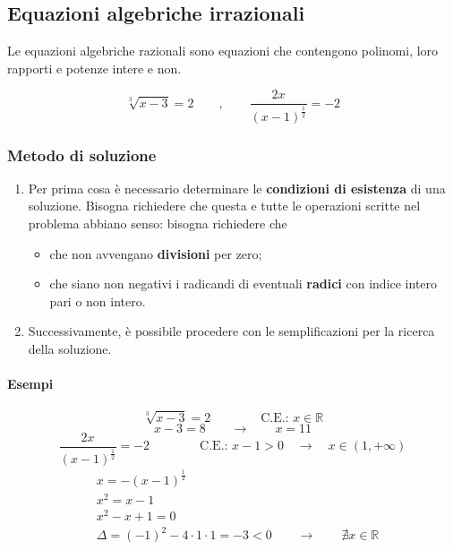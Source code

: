 \subsection{Equazioni algebriche irrazionali}
\begin{definition} Le equazioni algebriche razionali sono equazioni che contengono polinomi, loro rapporti e potenze intere e non.
\end{definition}
\begin{example}
\begin{equation}
    \sqrt[3]{x-3} = 2 \qquad , \qquad \dfrac{2 x}{(x-1)^{\frac{1}{2}}} = - 2
\end{equation}
\end{example}
\subsubsection{Metodo di soluzione}
\begin{enumerate}
    \item Per prima cosa è necessario determinare le \textbf{condizioni di esistenza} di una soluzione. Bisogna richiedere che questa e tutte le operazioni scritte nel problema abbiano senso: bisogna richiedere che
        \begin{itemize}
            \item che non avvengano \textbf{divisioni} per zero;
            \item che siano non negativi i radicandi di eventuali \textbf{radici} con indice intero pari o non intero.
        \end{itemize}
    \item Successivamente, è possibile procedere con le semplificazioni per la ricerca della soluzione.
\end{enumerate}

\paragraph{Esempi}
\begin{equation}
    \sqrt[3]{x-3} = 2 \qquad \qquad \text{C.E.: } x \in \mathbb{R}
\end{equation}
\begin{equation}
    x-3 = 8 \qquad \rightarrow \qquad x = 11
\end{equation}
\begin{equation}
    \dfrac{2 x}{(x-1)^{\frac{1}{2}}} = - 2 \qquad \qquad \text{C.E.: } x-1>0 \quad \rightarrow \quad x \in (1,+\infty)
\end{equation}
\begin{equation}
\begin{aligned}
    &  x = -  (x-1)^{\frac{1}{2}} \\
    &  x^2 =   x-1  \\
    & x^2 - x + 1 = 0 \\
    & \Delta = (-1)^2 - 4 \cdot 1 \cdot 1 = -3 < 0 \qquad \rightarrow \qquad \nexists x \in \mathbb{R}
\end{aligned}
\end{equation}

